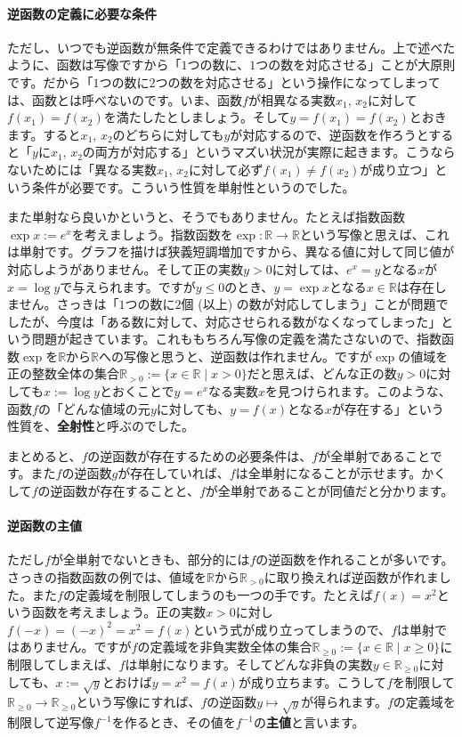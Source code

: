 \paragraph{逆函数の定義に必要な条件}

ただし、いつでも逆函数が無条件で定義できるわけではありません。上で述べたように、函数は写像ですから「$1$つの数に、$1$つの数を対応させる」ことが大原則です。だから「$1$つの数に$2$つの数を対応させる」という操作になってしまっては、函数とは呼べないのです。いま、函数$f$が相異なる実数$x_1$, $x_2$に対して$f(x_1)=f(x_2)$を満たしたとしましょう。そして$y=f(x_1)=f(x_2)$とおきます。すると$x_1$, $x_2$のどちらに対しても$y$が対応するので、逆函数を作ろうとすると「$y$に$x_1$, $x_2$の両方が対応する」というマズい状況が実際に起きます。こうならないためには「異なる実数$x_1$, $x_2$に対して必ず$f(x_1)\neq f(x_2)$が成り立つ」という条件が必要です。こういう性質を$\textbf{単射性}$というのでした。

また単射なら良いかというと、そうでもありません。たとえば指数函数$\exp x:=e^x$を考えましょう。指数函数を$\exp\colon \mathbb{R}\rightarrow\mathbb{R}$という写像と思えば、これは単射です。グラフを描けば狭義短調増加ですから、異なる値に対して同じ値が対応しようがありません。そして正の実数$y>0$に対しては、$e^x = y$となる$x$が$x=\log y$で与えられます。ですが$y\leq 0$のとき、$y=\exp x$となる$x\in\mathbb{R}$は存在しません。さっきは「$1$つの数に$2$個 (以上) の数が対応してしまう」ことが問題でしたが、今度は「ある数に対して、対応させられる数がなくなってしまった」という問題が起きています。これももちろん写像の定義を満たさないので、指数函数$\exp$を$\mathbb{R}$から$\mathbb{R}$への写像と思うと、逆函数は作れません。ですが$\exp$の値域を正の整数全体の集合$\mathbb{R}_{>0}:=\{x\in\mathbb{R} \mid x>0 \}$だと思えば、どんな正の数$y>0$に対しても$x:=\log y$とおくことで$y=e^x$なる実数$x$を見つけられます。このような、函数$f$の「どんな値域の元$y$に対しても、$y=f(x)$となる$x$が存在する」という性質を、\textbf{全射性}と呼ぶのでした。

まとめると、$f$の逆函数が存在するための必要条件は、$f$が全単射であることです。また$f$の逆函数$g$が存在していれば、$f$は全単射になることが示せます。かくして$f$の逆函数が存在することと、$f$が全単射であることが同値だと分かります。

\paragraph{逆函数の主値}

ただし$f$が全単射でないときも、部分的には$f$の逆函数を作れることが多いです。さっきの指数函数の例では、値域を$\mathbb{R}$から$\mathbb{R}_{>0}$に取り換えれば逆函数が作れました。また$f$の定義域を制限してしまうのも一つの手です。たとえば$f(x)=x^2$という函数を考えましょう。正の実数$x>0$に対し$f(-x)=(-x)^2=x^2=f(x)$という式が成り立ってしまうので、$f$は単射ではありません。ですが$f$の定義域を非負実数全体の集合$\mathbb{R}_{\geq 0}:=\{x\in\mathbb{R}\mid x\geq 0\}$に制限してしまえば、$f$は単射になります。そしてどんな非負の実数$y\in\mathbb{R}_{\geq 0}$に対しても、$x:=\sqrt{y}$とおけば$y=x^2=f(x)$が成り立ちます。こうして$f$を制限して$\mathbb{R}_{\geq 0}\rightarrow\mathbb{R}_{\geq 0}$という写像にすれば、$f$の逆函数$y\mapsto \sqrt{y}$が得られます。$f$の定義域を制限して逆写像$f^{-1}$を作るとき、その値を$f^{-1}$の\textbf{主値}と言います。

